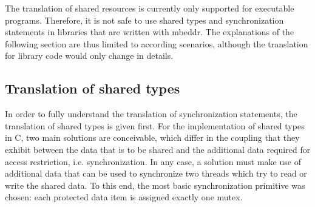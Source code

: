 The translation of shared resources is currently only supported for executable programs. Therefore, it is not safe to use shared types and synchronization statements in libraries that are written with mbeddr. The explanations of the following section are thus limited to according scenarios, although the translation for library code would only change in details.

\subsection{Translation of shared types}
\label{sharedTypesTranslation}
In order to fully understand the translation of synchronization statements, the translation of shared types is given first. For the implementation of shared types in C, two main solutions are conceivable, which differ in the coupling that they exhibit between the data that is to be shared and the additional data required for access restriction, i.e. synchronization. In any case, a solution must make use of additional data that can be used to synchronize two threads which try to read or write the shared data. To this end, the most basic synchronization primitive was chosen: each protected data item is assigned exactly one mutex. 

